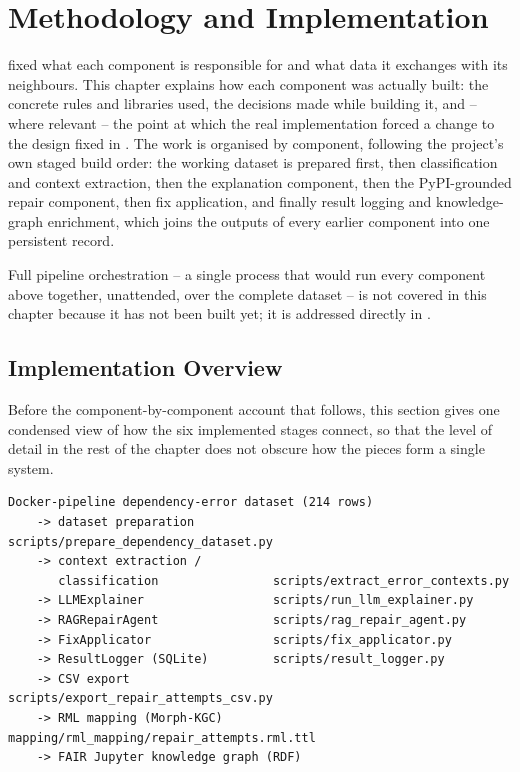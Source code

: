 \chapter{Methodology and Implementation}
\label{chap:methodology}

 fixed what each component is responsible for and
what data it exchanges with its neighbours. This chapter explains how each
component was actually built: the concrete rules and libraries used, the
decisions made while building it, and -- where relevant -- the point at
which the real implementation forced a change to the design fixed in
. The work is organised by component, following the
project's own staged build order: the working dataset is prepared first,
then classification and context extraction, then the explanation component,
then the PyPI-grounded repair component, then fix application, and finally
result logging and knowledge-graph enrichment, which joins the outputs of
every earlier component into one persistent record.

Full pipeline orchestration -- a single process that would run every
component above together, unattended, over the complete dataset -- is not
covered in this chapter because it has not been built yet; it is addressed
directly in .

\section{Implementation Overview}
\label{sec:m-overview}

Before the component-by-component account that follows, this section gives
one condensed view of how the six implemented stages connect, so that the
level of detail in the rest of the chapter does not obscure how the pieces
form a single system.

\begin{verbatim}
Docker-pipeline dependency-error dataset (214 rows)
    -> dataset preparation           scripts/prepare_dependency_dataset.py
    -> context extraction /
       classification                scripts/extract_error_contexts.py
    -> LLMExplainer                  scripts/run_llm_explainer.py
    -> RAGRepairAgent                scripts/rag_repair_agent.py
    -> FixApplicator                 scripts/fix_applicator.py
    -> ResultLogger (SQLite)         scripts/result_logger.py
    -> CSV export                    scripts/export_repair_attempts_csv.py
    -> RML mapping (Morph-KGC)       mapping/rml_mapping/repair_attempts.rml.ttl
    -> FAIR Jupyter knowledge graph (RDF)
\end{verbatim}

